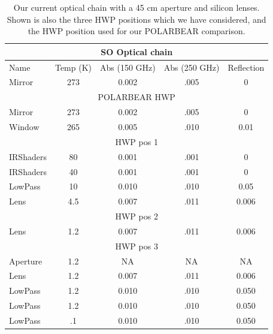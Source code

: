 \documentclass{article}
\theoremstyle{remark}
\begin{document}
\begin{table}
\begin{center}

\begin{tabular}{ |l|c|c|c|c|} 
	\hline
	\multicolumn{5}{|c|}{SO Optical chain}\\
	\hline
	 Name 		& Temp (K)	& Abs (150 GHz) & Abs (250 GHz) & Reflection \\ \hline
	 Mirror 	&	273		& 0.002 & .005 & 0 \\
	 \hline \multicolumn{5}{|c|}{POLARBEAR HWP}\\ \hline
	 Mirror 	&	273		& 0.002 & .005 & 0 \\
	 Window 	&	265		& 0.005 & .010 & 0.01 \\
	 \hline \multicolumn{5}{|c|}{HWP pos 1}\\ \hline
	 IRShaders 	&	80		& 0.001 & .001 & 0 \\
	 IRShaders 	&	40		& 0.001 & .001 & 0 \\
	 LowPass 	&	10		& 0.010 & .010 & 0.05 \\
	 Lens 		&	4.5		& 0.007 & .011 & 0.006 \\
	 \hline \multicolumn{5}{|c|}{HWP pos 2}\\ \hline
	 Lens 		&	1.2		& 0.007 & .011 & 0.006 \\
	 \hline \multicolumn{5}{|c|}{HWP pos 3}\\ \hline
	 Aperture 	&	1.2		&  NA  &  NA  & NA \\
	 Lens 		&	1.2		& 0.007 & .011 & 0.006 \\
	 LowPass 	&	1.2		& 0.010 & .010 & 0.050 \\
	 LowPass 	&	1.2		& 0.010 & .010 & 0.050 \\
	 LowPass 	&	.1		& 0.010 & .010 & 0.050 \\
	\hline	
\end{tabular}
\end{center}
\caption{Our current optical chain with a 45 cm aperture and silicon lenses.
Shown is also the three HWP positions which we have considered, and the HWP position used for our POLARBEAR comparison.
}

\label{table:SO_OpticalChain}
\end{table}
\end{document}
